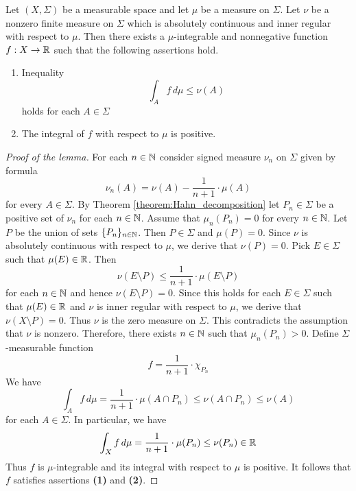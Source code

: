 \begin{lemma}\label{lemma:nontrivial_mu_simple_function_below_nu}
    Let $(X,\Sigma)$ be a measurable space and let $\mu$ be a measure on $\Sigma$. Let $\nu$ be a nonzero finite measure on $\Sigma$ which is absolutely continuous and inner regular with respect to $\mu$. Then there exists a $\mu$-integrable and nonnegative function $f:X\rightarrow {\mathbb R}$ such that the following assertions hold.
    \begin{enumerate}[label=\emph{\textbf{(\roman*)}}, leftmargin=3.0em]
        \item Inequality
              $$\int_Af\,d\mu \leq \nu(A)$$
              holds for each $A \in \Sigma$
        \item The integral of $f$ with respect to $\mu$ is positive.
    \end{enumerate}
\end{lemma}
\begin{proof}[Proof of the lemma]
    For each $n \in {\mathbb N}$ consider signed measure $\nu_n$ on $\Sigma$ given by formula
    $$\nu_n(A) = \nu(A) - \frac{1}{n+1}\cdot \mu(A)$$
    for every $A \in \Sigma$. By Theorem \ref{theorem:Hahn_decomposition} let $P_n \in \Sigma$ be a positive set of $\nu_n$ for each $n \in {\mathbb N}$. Assume that $\mu_n(P_n) = 0$ for every $n\in {\mathbb N}$. Let $P$ be the union of sets $\{P_n\}_{n\in {\mathbb N}}$. Then $P \in \Sigma$ and $\mu(P) = 0$. Since $\nu$ is absolutely continuous with respect to $\mu$, we derive that $\nu(P) = 0$. Pick $E \in \Sigma$ such that $\mu(E) \in {\mathbb R}$. Then
    $$\nu(E\setminus P) \leq \frac{1}{n+1} \cdot \mu(E\setminus P)$$
    for each $n \in {\mathbb N}$ and hence $\nu(E\setminus P) = 0$. Since this holds for each $E \in \Sigma$ such that $\mu(E) \in {\mathbb R}$ and $\nu$ is inner regular with respect to $\mu$, we derive that $\nu(X\setminus P) = 0$. Thus $\nu$ is the zero measure on $\Sigma$. This contradicts the assumption that $\nu$ is nonzero. Therefore, there exists $n \in {\mathbb N}$ such that $\mu_n(P_n) > 0$. Define $\Sigma$-measurable function
    $$f = \frac{1}{n + 1}\cdot \chi_{P_n}$$
    We have
    $$\int_Af\,d\mu = \frac{1}{n+1}\cdot \mu(A\cap P_n) \leq \nu(A\cap P_n) \leq \nu(A)$$
    for each $A \in \Sigma$. In particular, we have
    $$\int_Xf\,d\mu = \frac{1}{n+1}\cdot \mu(P_n) \leq \nu(P_n) \in {\mathbb R}$$
    Thus $f$ is $\mu$-integrable and its integral with respect to $\mu$ is positive. It follows that $f$ satisfies assertions \textbf{(1)} and \textbf{(2)}.
\end{proof}

